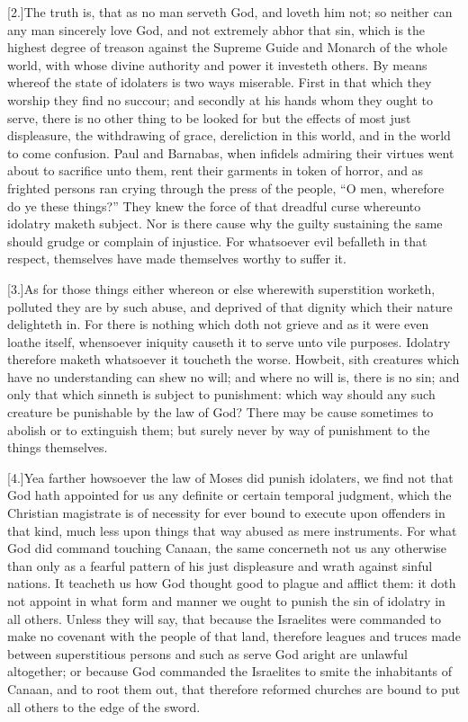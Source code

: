 [2.]The truth is, that as no man serveth God, and loveth him not; so neither can any man sincerely love God, and not extremely abhor that sin, which is the highest degree of treason against the Supreme Guide and Monarch of the whole world, with whose divine authority and power it investeth others. By means whereof the state of idolaters is two ways miserable. First in that which they worship they find no succour; and secondly at his hands whom they ought to serve, there is no other thing to be looked for but the effects of most just displeasure, the withdrawing of grace, dereliction in this world, and in the world to come confusion.  Paul and Barnabas,
 when infidels admiring their virtues went about to sacrifice unto them, rent their garments in token of horror, and as frighted persons ran crying through the press of the people, “O men, wherefore do ye these things?” They knew the force of that dreadful curse whereunto idolatry maketh subject. Nor is there cause why the guilty sustaining the same should grudge or complain of injustice. For whatsoever evil befalleth in that respect, themselves have made themselves worthy to suffer it.

[3.]As for those things either whereon or else wherewith superstition worketh, polluted they are by such abuse, and deprived of that dignity which their nature delighteth in. For there is nothing which doth not grieve and as it were even loathe itself, whensoever iniquity causeth it to serve unto vile purposes. Idolatry therefore maketh whatsoever it toucheth the worse. Howbeit, sith creatures which have no understanding can shew no will; and where no will is, there is no sin; and only that which sinneth is subject to punishment: which way should any such creature be punishable by the law of God? There may be cause sometimes to abolish or to extinguish them; but surely never by way of punishment to the things themselves.

[4.]Yea farther howsoever the law of Moses did punish idolaters, we find not that God hath appointed for us any definite or certain temporal judgment, which the Christian magistrate is of necessity for ever bound to execute upon offenders in that kind, much less upon things that way abused as mere instruments. For what God did command touching Canaan, the same concerneth not us any otherwise than only as a fearful pattern of his just displeasure and wrath against sinful nations. It teacheth us how God thought good to plague and afflict them: it doth not appoint in what form and manner we ought to punish the sin of idolatry in all others. Unless they will say, that because the Israelites were commanded to make no covenant with the people of that land, therefore leagues and truces made between superstitious persons and such as serve God aright are unlawful altogether; or because God commanded the Israelites to smite the inhabitants of Canaan, and to root them out, that therefore  reformed churches are bound to put all others to the edge of the sword.

